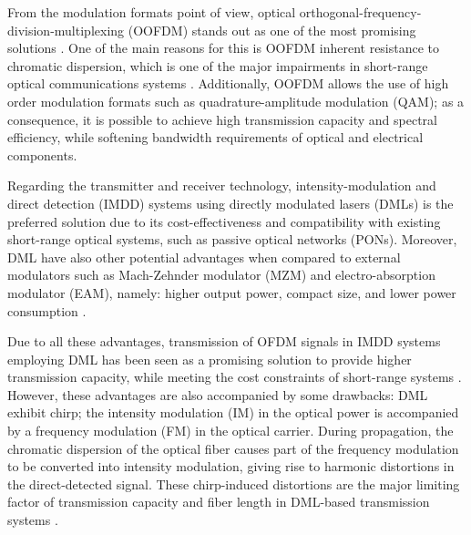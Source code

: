 \documentclass[journal]{IEEEtran}
\begin{document}
From the modulation formats point of view, optical orthogonal-frequency-division-multiplexing (OOFDM) stands out as one of the most promising solutions \cite{OFDM:promising,OFDM-PON,OFDM-128QAM,OFDM-IMDD,OFDM-UWB}. One of the main reasons for this is OOFDM inherent resistance to chromatic dispersion, which is one of the major impairments in short-range optical communications systems \cite{OFDM-IMDD}. Additionally, OOFDM allows the use of high order modulation formats such as quadrature-amplitude modulation (QAM); as a consequence, it is possible to achieve high transmission capacity and spectral efficiency, while softening bandwidth requirements of optical and electrical components. 

Regarding the transmitter and receiver technology, intensity-modulation and direct detection (IMDD) systems using directly modulated lasers (DMLs) is the preferred solution due to its cost-effectiveness and compatibility with existing short-range optical systems, such as passive optical networks (PONs). Moreover, DML have also other potential advantages when compared to external modulators such as Mach-Zehnder modulator (MZM) and electro-absorption modulator (EAM), namely: higher output power, compact size, and lower power consumption \cite{OFDM-DML10Gbs, kaminow}.  

Due to all these advantages, transmission of OFDM signals in IMDD systems employing DML has been seen as a promising solution to provide higher transmission capacity, while meeting the cost constraints of short-range systems \cite{OFDM:promising,OFDM-PON,OFDM-128QAM,OFDM-IMDD,OFDM-UWB}. However, these advantages are also accompanied by some drawbacks: DML exhibit chirp; the intensity modulation (IM) in the optical power is accompanied by a frequency modulation (FM) in the optical carrier. During propagation, the chromatic dispersion of the optical fiber causes part of the frequency modulation to be converted into intensity modulation, giving rise to harmonic distortions in the direct-detected signal. These chirp-induced distortions are the major limiting factor of transmission capacity and fiber length in DML-based transmission systems \cite{laserparam}.
\end{document}
